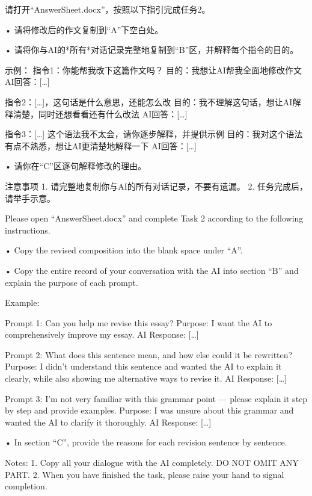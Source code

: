 \documentclass[english]{textolivre}
\begin{document}
请打开“AnswerSheet.docx”，按照以下指引完成任务2。

•	请将修改后的作文复制到“A”下空白处。

•	请将你与AI的*所有*对话记录完整地复制到“B”区，并解释每个指令的目的。

示例：
指令1：你能帮我改下这篇作文吗？
目的：我想让AI帮我全面地修改作文
AI回答：[…]

指令2：[…]，这句话是什么意思，还能怎么改
目的：我不理解这句话，想让AI解释清楚，同时还想看看还有什么改法
AI回答：[…]

指令3：[…] 这个语法我不太会，请你逐步解释，并提供示例
目的：我对这个语法有点不熟悉，想让AI更清楚地解释一下
AI回答：[…]

•	请你在“C”区逐句解释修改的理由。


注意事项
1.	请完整地复制你与AI的所有对话记录，不要有遗漏。
2.	任务完成后，请举手示意。

Please open “AnswerSheet.docx” and complete Task 2 according to the following instructions.

• Copy the revised composition into the blank space under “A”.

• Copy the entire record of your conversation with the AI into section “B” and explain the purpose of each prompt.

Example:

Prompt 1: Can you help me revise this essay?
Purpose: I want the AI to comprehensively improve my essay.
AI Response: […]

Prompt 2: What does this sentence mean, and how else could it be rewritten?
Purpose: I didn’t understand this sentence and wanted the AI to explain it clearly, while also showing me alternative ways to revise it.
AI Response: […]

Prompt 3: I’m not very familiar with this grammar point — please explain it step by step and provide examples.
Purpose: I was unsure about this grammar and wanted the AI to clarify it thoroughly.
AI Response: […]

•	In section “C”, provide the reasons for each revision sentence by sentence.

Notes:
1.	Copy all your dialogue with the AI completely. DO NOT OMIT ANY PART.
2.	When you have finished the task, please raise your hand to signal completion.\\
\end{document}
